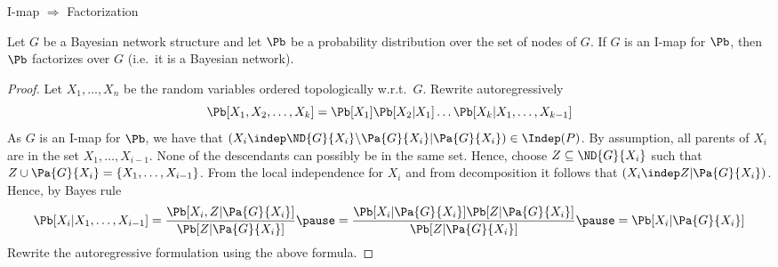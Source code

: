\begin{frame}{I-map $\Rightarrow$ Factorization}
\begin{theorem}
    Let $G$ be a Bayesian network structure and let $\Pb$ be a probability distribution over the set of nodes of $G$. If $G$ is an I-map for $\Pb$, then $\Pb$ factorizes over $G$ (i.e.\ it is a Bayesian network).
    \end{theorem}
    \pause
    \begin{proof}
    Let $X_1,\ldots,X_n$ be the random variables ordered topologically w.r.t.\ $G$.
    \pause
    Rewrite autoregressively
    \begin{equation}
    \Pb[X_1,X_2,\ldots,X_k] = \Pb[X_1] \Pb[X_2 | X_1] \ldots \Pb[X_k | X_1,\ldots,X_{k-1}]
    \end{equation}
    \pause
    As $G$ is an I-map for $\Pb$, we have that
    \pause
    $(X_i \indep \ND{G}{X_i} \backslash \Pa{G}{X_i} | \Pa{G}{X_i}) \in \Indep(P)$.
    \pause
    By assumption, all parents of $X_i$ are in the set $X_1,\ldots,X_{i-1}$.
    \pause
    None of the descendants can possibly be in the same set.
    \pause
    Hence, choose $Z \subseteq \ND{G}{X_i}$ such that $Z \cup \Pa{G}{X_i} = \{X_1,\ldots,X_{i-1}\}$.
    \pause
    From the local independence for $X_i$ and from decomposition it follows that $(X_i \indep Z | \Pa{G}{X_i})$.
    \pause
    Hence, by Bayes rule
    \begin{equation}
\Pb[X_i | X_1,\ldots,X_{i-1}]
= \frac{\Pb[X_i,Z | \Pa{G}{X_i}]}{\Pb[Z | \Pa{G}{X_i}]}
\pause
= \frac{\Pb[X_i | \Pa{G}{X_i}] \Pb[Z | \Pa{G}{X_i}]}{\Pb[Z | \Pa{G}{X_i}]}
\pause
= \Pb[X_i | \Pa{G}{X_i}]
    \end{equation}
    \pause
    Rewrite the autoregressive formulation using the above formula.
    \end{proof}
    \end{frame}

